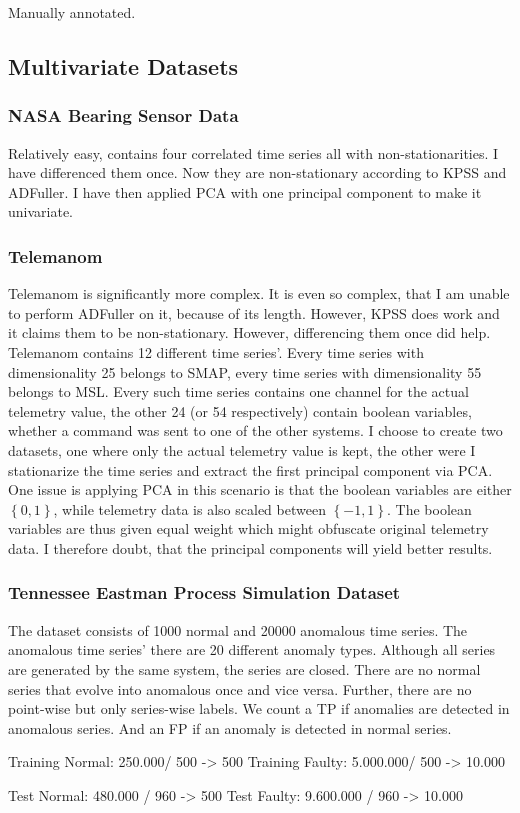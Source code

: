 Manually annotated.





\subsection{Multivariate Datasets}

\subsubsection{NASA Bearing Sensor Data}
Relatively easy, contains four correlated time series all with non-stationarities.
I have differenced them once. Now they are non-stationary according to KPSS and
ADFuller. I have then applied PCA with one principal component to make it univariate.

\subsubsection{Telemanom}
Telemanom is significantly more complex. It is even so complex, that I am unable
to perform ADFuller on it, because of its length. However, KPSS does work and it
claims them to be non-stationary. However, differencing them once did help.
Telemanom contains 12 different time series'. Every time series with dimensionality
25 belongs to SMAP, every time series with dimensionality 55 belongs to MSL.
Every such time series contains one channel for the actual telemetry value, the
other 24 (or 54 respectively) contain boolean variables, whether a command was
sent to one of the other systems. I choose to create two datasets, one where
only the actual telemetry value is kept, the other were I stationarize the time
series and extract the first principal component via PCA. One issue is applying
PCA in this scenario is that the boolean variables are either \(\left\{0,1\right\}\),
while telemetry data is also scaled between \(\left\{ -1, 1 \right\}\). The boolean
variables are thus given equal weight which might obfuscate original telemetry
data. I therefore doubt, that the principal components will yield better results.


\subsubsection{Tennessee Eastman Process Simulation Dataset}
The dataset consists of 1000 normal and 20000 anomalous time series. The anomalous
time series' there are 20 different anomaly types. Although all series are generated
by the same system, the series are closed. There are no normal series that evolve
into anomalous once and vice versa. Further, there are no point-wise but only
series-wise labels. We count a TP if anomalies are detected in anomalous series.
And an FP if an anomaly is detected in normal series.


Training Normal: 250.000/ 500 -> 500
Training Faulty: 5.000.000/ 500 -> 10.000

Test Normal: 480.000 / 960 -> 500
Test Faulty: 9.600.000 / 960 -> 10.000